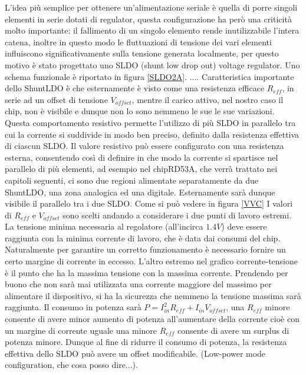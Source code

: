 L'idea più semplice per ottenere un'alimentazione seriale è quella di porre singoli elementi in serie dotati di regulator, questa configurazione ha però una criticità molto importante: il fallimento di un singolo elemento rende inutilizzabile l'intera catena, inoltre in questo modo le fluttuazioni di tensione dei vari elementi influiscono significativamente  sulla tensione generata localmente, per questo motivo è stato progettato uno SLDO (shunt low drop out) voltage regulator. Uno schema funzionale è riportato in figura \ref{SLDO2A}.
....
% 
Caratteristica importante dello ShuntLDO è che esternamente è visto come una resistenza efficace $R_{eff}$, in serie ad un offset di tensione $V_{offset}$, mentre il carico attivo, nel nostro caso il chip, non è visibile e dunque non lo sono nemmeno le sue le sue variazioni. 
Questa comportamento resistivo permette l'utilizzo di più SLDO in parallelo tra cui la corrente si suddivide in modo ben preciso, definito dalla resistenza effettiva di ciascun SLDO. Il valore resistivo può essere configurato con una resistenza esterna, consentendo così di definire in che modo la corrente si spartisce nel parallelo di più elementi, ad esempio nel chipRD53A, che verrà trattato nei capitoli seguenti, ci sono due regioni alimentate separatamente da due ShuntLDO, una zona analogica ed una digitale. Esternamente sarà dunque visibile il parallelo tra i due SLDO. Come si può vedere in figura \ref{VVC} I valori di $R_{eff}$ e $V_{offset}$ sono scelti andando a considerare i due punti di lavoro estremi. La tensione minima necessaria al regolatore (all'incirca $1.4V$) deve essere raggiunta con la minima corrente di lavoro, che è data dai consumi del chip. Naturalmente per garantire un corretto funzionamento è necessario fornire un certo margine di corrente in eccesso. L'altro estremo nel grafico corrente-tensione è il punto che ha la massima tensione con la massima corrente. Prendendo per buono che non sarà mai utilizzata una corrente maggiore del massimo per alimentare il dispositivo, si ha la sicurezza che nemmeno la tensione massima sarà raggiunta. 
Il consumo in potenza sarà $P=I_{in}^2R_{eff}+I_{in}V_{offset}$, una $R_{eff}$ minore consente di avere minor aumento di potenza all'aumentare della corrente %
cioè con un margine di corrente uguale una minore $R_{eff}$ consente di avere un surplus di potenza minore. Dunque al fine di ridurre il consumo di potenza, la resistenza effettiva dello SLDO può avere un offset modificabile. (Low-power mode configuration, che cosa posso dire...).

